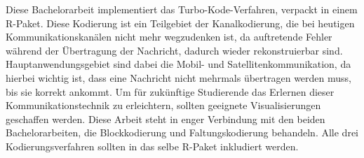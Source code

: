 Diese Bachelorarbeit implementiert das Turbo-Kode-Verfahren, verpackt in einem R-Paket. Diese Kodierung ist ein Teilgebiet der Kanalkodierung, die bei heutigen Kommunikationskanälen nicht mehr wegzudenken ist, da auftretende Fehler während der Übertragung der Nachricht, dadurch wieder rekonstruierbar sind. Hauptanwendungsgebiet sind dabei die Mobil- und Satellitenkommunikation, da hierbei wichtig ist, dass eine Nachricht nicht mehrmals übertragen werden muss, bis sie korrekt ankommt. Um für zukünftige Studierende das Erlernen dieser Kommunikationstechnik zu erleichtern, sollten geeignete Visualisierungen geschaffen werden. Diese Arbeit steht in enger Verbindung mit den beiden Bachelorarbeiten, die Blockkodierung und Faltungskodierung behandeln. Alle drei Kodierungsverfahren sollten in das selbe R-Paket inkludiert werden.
